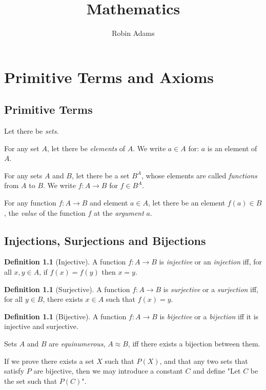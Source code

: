 \documentclass{book}
\title{Mathematics}
\author{Robin Adams}
\theoremstyle{definition}
\newtheorem{df}[ax]{Definition}
\begin{document}
\maketitle
\tableofcontents

\chapter{Primitive Terms and Axioms}

\section{Primitive Terms} %

Let there be \emph{sets}.

For any set $A$, let there be \emph{elements} of $A$. We write $a \in A$ for: $a$ is an element of $A$.

For any sets $A$ and $B$, let there be a set $B^A$, whose elements are called \emph{functions} from $A$ to $B$. We write $f : A \rightarrow B$ for $f \in B^A$.

For any function $f : A \rightarrow B$ and element $a \in A$, let there be an element $f(a) \in B$, the \emph{value} of the function $f$ at the \emph{argument} $a$.

\section{Injections, Surjections and Bijections} %

\begin{df}[Injective]
A function $f : A \rightarrow B$ is \emph{injective} or an \emph{injection} iff, for all $x,y \in A$, if $f(x) = f(y)$ then $x = y$.
\end{df}

\begin{df}[Surjective]
A function $f : A \rightarrow B$ is \emph{surjective} or a \emph{surjection} iff, for all $y \in B$, there exists $x \in A$ such that $f(x) = y$.
\end{df}

\begin{df}[Bijective]
A function $f : A \rightarrow B$ is \emph{bijective} or a \emph{bijection} iff it is injective and surjective.

Sets $A$ and $B$ are \emph{equinumerous}, $A \approx B$, iff there exists a bijection between them.
\end{df}

If we prove there exists a set $X$ such that $P(X)$, and that any two sets that satisfy $P$ are bijective, then we may introduce a constant $C$ and define "Let $C$ be the set such that $P(C)$".
\end{document}
